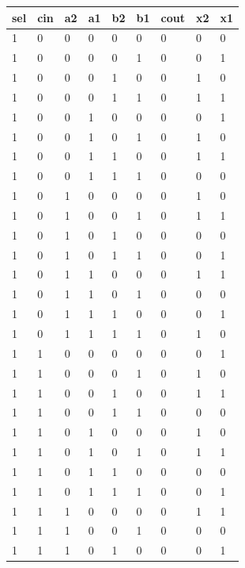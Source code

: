 \documentclass[11pt]{article}
\begin{document}
\begin{table}[H]
\begin{center}
	\begin{tabular}{| l | l | l | l | l | l | l | l | l |}
		\hline
		sel & cin & a2 & a1 & b2 & b1 & cout & x2 & x1 \\ \hline
		1 & 0 & 0 & 0 & 0 & 0 & 0 & 0 & 0 \\ \hline
		1 & 0 & 0 & 0 & 0 & 1 & 0 & 0 & 1 \\ \hline
		1 & 0 & 0 & 0 & 1 & 0 & 0 & 1 & 0 \\ \hline
		1 & 0 & 0 & 0 & 1 & 1 & 0 & 1 & 1 \\ \hline
		1 & 0 & 0 & 1 & 0 & 0 & 0 & 0 & 1 \\ \hline
		1 & 0 & 0 & 1 & 0 & 1 & 0 & 1 & 0 \\ \hline
		1 & 0 & 0 & 1 & 1 & 0 & 0 & 1 & 1 \\ \hline
		1 & 0 & 0 & 1 & 1 & 1 & 0 & 0 & 0 \\ \hline
		1 & 0 & 1 & 0 & 0 & 0 & 0 & 1 & 0 \\ \hline
		1 & 0 & 1 & 0 & 0 & 1 & 0 & 1 & 1 \\ \hline
		1 & 0 & 1 & 0 & 1 & 0 & 0 & 0 & 0 \\ \hline
		1 & 0 & 1 & 0 & 1 & 1 & 0 & 0 & 1 \\ \hline
		1 & 0 & 1 & 1 & 0 & 0 & 0 & 1 & 1 \\ \hline
		1 & 0 & 1 & 1 & 0 & 1 & 0 & 0 & 0 \\ \hline
		1 & 0 & 1 & 1 & 1 & 0 & 0 & 0 & 1 \\ \hline
		1 & 0 & 1 & 1 & 1 & 1 & 0 & 1 & 0 \\ \hline
		1 & 1 & 0 & 0 & 0 & 0 & 0 & 0 & 1 \\ \hline
		1 & 1 & 0 & 0 & 0 & 1 & 0 & 1 & 0 \\ \hline
		1 & 1 & 0 & 0 & 1 & 0 & 0 & 1 & 1 \\ \hline
		1 & 1 & 0 & 0 & 1 & 1 & 0 & 0 & 0 \\ \hline
		1 & 1 & 0 & 1 & 0 & 0 & 0 & 1 & 0 \\ \hline
		1 & 1 & 0 & 1 & 0 & 1 & 0 & 1 & 1 \\ \hline
		1 & 1 & 0 & 1 & 1 & 0 & 0 & 0 & 0 \\ \hline
		1 & 1 & 0 & 1 & 1 & 1 & 0 & 0 & 1 \\ \hline
		1 & 1 & 1 & 0 & 0 & 0 & 0 & 1 & 1 \\ \hline
		1 & 1 & 1 & 0 & 0 & 1 & 0 & 0 & 0 \\ \hline
		1 & 1 & 1 & 0 & 1 & 0 & 0 & 0 & 1 \\ \hline

\end{tabular}
\end{center}
\end{table}
\end{document}
